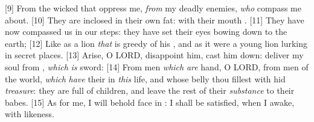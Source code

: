[9] \textcolor[cmyk]{0.99998,1,0,0}{From the wicked that oppress me, \emph{from} my deadly enemies, \emph{who} compass me about.}
[10] \textcolor[cmyk]{0.99998,1,0,0}{They are inclosed in their own fat: with their mouth .}
[11] \textcolor[cmyk]{0.99998,1,0,0}{They have now compassed us in our steps: they have set their eyes bowing down to the earth;}
[12] \textcolor[cmyk]{0.99998,1,0,0}{Like as a lion \emph{that} is greedy of his , and as it were a young lion lurking in secret places.}
[13] \textcolor[cmyk]{0.99998,1,0,0}{Arise, O LORD, disappoint him, cast him down: deliver my soul from , \emph{which} \emph{is}  sword:}
[14] \textcolor[cmyk]{0.99998,1,0,0}{From men \emph{which} \emph{are}  hand, O LORD, from men of the world, \emph{which} \emph{have} their  in \emph{this} life, and whose belly thou fillest with  hid \emph{treasure}: they are full of children, and leave the rest of their \emph{substance} to their babes.}
[15] \textcolor[cmyk]{0.99998,1,0,0}{As for me, I will behold  face in : I shall be satisfied, when I awake, with  likeness.}